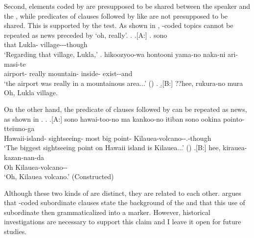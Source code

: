 Second,
 elements coded by  are presupposed to be shared between the speaker and the ,
while predicates of  clauses followed by  like \Last are not presupposed to be shared.
This is supported by the  test.
As shown in \Next, -coded topics cannot be repeated as news preceded by  `oh, really'.
%
\ex. \a.[A:]
 \ag. sono   \\
   that Lukla- village---though \\
   `Regarding that village, Lukla,'
  \bg. hikoozyoo-wa hontooni yama-no naka-ni ari-masi-te \\
    airport- really mountain- inside- exist--and \\
    `the airport was really in a mountainous area...'
    \hfill{()}
   \z.
   \b.[B:] ??hee, rukura-no mura \\
     Oh, Lukla village.
%

On the other hand,
the predicate of  clauses followed by  can be repeated as news, as shown in \Next.
%
\ex. \ag.[A:] sono hawai-too-no ma kankoo-no itiban sono ookina pointo-tteiuno-ga  \\
		 Hawaii-island-  sightseeing- most  big point- Kilauea-volcano--.-though \\
		`The biggest sightseeing point on Hawaii island is Kilauea...'
		\hfill{()}
	\bg.[B:] hee, kirauea-kazan-nan-da \\
	  Oh Kilauea-volcano--  \\
	  `Oh, Kilauea volcano.'
	  \hfill{(Constructed)}


Although these two kinds of  are distinct,
they are related to each other.
 argues that
-coded subordinate clauses state the background of the  and
that this use of subordinate  then grammaticalized into a  marker.
However, historical investigations are necessary to support this claim
and I leave it open for future studies.

